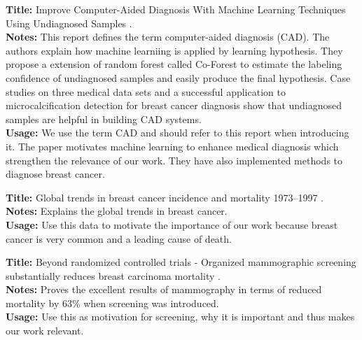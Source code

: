 \documentclass[a4paper]{article}
\begin{document}
\noindent
\textbf{Title:} Improve Computer-Aided Diagnosis With Machine Learning Techniques Using Undiagnosed Samples \cite{li2007}.
\\
\textbf{Notes:} This report defines the term computer-aided diagnosis (CAD). The authors explain how machine learniing is applied by learning hypothesis. They propose a extension of random forest called Co-Forest
to estimate the labeling confidence of undiagnosed samples and
easily produce the final hypothesis. Case studies on three medical data sets and a successful application to microcalcification detection for breast cancer diagnosis show that
undiagnosed samples are helpful in building CAD systems.
\\
\textbf{Usage:} We use the term CAD and should refer to this report when introducing it. The paper motivates machine learning to enhance medical diagnosis which strengthen the relevance of our work. They have also implemented methods to diagnose breast cancer.
\\\par

\noindent
\textbf{Title:} Global trends in breast cancer incidence and mortality 1973–1997 \cite{althuis2005}.
\\
\textbf{Notes:} Explains the global trends in breast cancer.
\\
\textbf{Usage:} Use this data to motivate the importance of our work because breast cancer is very common and a leading cause of death.
\\\par

\noindent
\textbf{Title:} Beyond randomized controlled trials - Organized mammographic screening substantially reduces breast carcinoma mortality \cite{tabar2001}.
\\
\textbf{Notes:} Proves the excellent results of mammography in terms of reduced mortality by 63\% when screening was introduced.
\\
\textbf{Usage:} Use this as motivation for screening, why it is important and thus makes our work relevant.
\\\par
\end{document}
